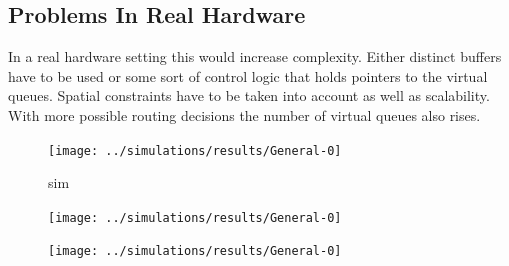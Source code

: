 \documentclass[]{scrartcl}
\begin{document}
\subsection{Problems In Real Hardware}
In a real hardware setting this would increase complexity.
Either distinct buffers have to be used or some sort of control logic that holds
pointers to the virtual queues. Spatial constraints have to be taken into account
as well as scalability. With more possible routing decisions the number of virtual
queues also rises.

\begin{figure}[ht]
    \centering
    \texttt{[image: ../simulations/results/General-0]}
    \caption{sim}%
    \label{fig:optsim_inport_qlen}
\end{figure}
\begin{figure}[ht]
    \centering
    \texttt{[image: ../simulations/results/General-0]}
    \caption{}%
    \label{fig:}
\end{figure}
\begin{figure}[ht]
    \centering
    \texttt{[image: ../simulations/results/General-0]}
    \caption{}%
    \label{fig:}
\end{figure}
\end{document}
